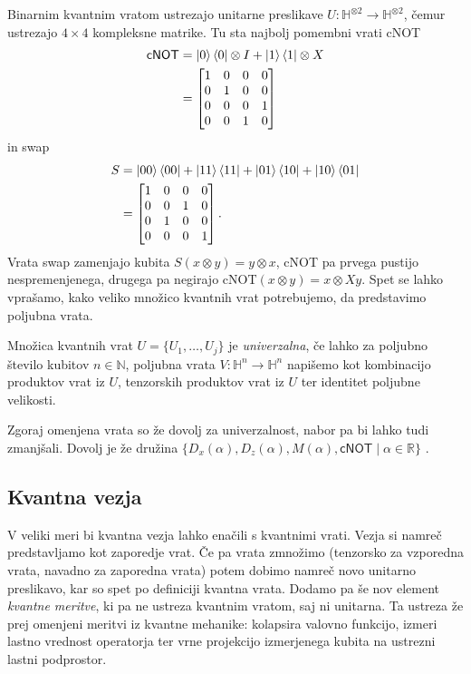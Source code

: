 \documentclass[mat1]{fmfdelo}
\newcommand{\R}{\mathbb R}
\newcommand{\N}{\mathbb N}
\newcommand{\Hb}{\mathbb H}
\begin{document}
Binarnim kvantnim vratom ustrezajo unitarne preslikave \(U:\Hb^{\otimes 2}\to \Hb^{\otimes 2}\), čemur ustrezajo \(4\times 4\) kompleksne matrike. Tu sta najbolj pomembni vrati \textsf{cNOT} 
\begin{align*}
    \mathsf{cNOT}&=\ket0\bra0\otimes I + \ket1\bra1\otimes X \\
    &=\begin{bmatrix}
        1&0&0&0\\
        0&1&0&0\\
        0&0&0&1\\
        0&0&1&0
    \end{bmatrix}
\end{align*}
in \textsf{swap}
\begin{align*}
    S &= \ket{00}\bra{00}+\ket{11}\bra{11}+\ket{01}\bra{10}+\ket{10}\bra{01}\\
    &=\begin{bmatrix}
        1&0&0&0\\
        0&0&1&0\\
        0&1&0&0\\
        0&0&0&1
    \end{bmatrix}.
\end{align*}
Vrata \textsf{swap} zamenjajo kubita \(S(x\otimes y)=y\otimes x\), \textsf{cNOT} pa prvega pustijo nespremenjenega, drugega pa negirajo \textsf{cNOT}\((x\otimes y)=x\otimes Xy\). Spet se lahko vprašamo, kako veliko množico kvantnih vrat potrebujemo, da predstavimo poljubna vrata.
\begin{definicija}
    Množica kvantnih vrat \(U=\{U_1,\ldots,U_j\}\) je \emph{univerzalna}, če lahko za poljubno število kubitov \(n\in\N\), poljubna vrata \(V:\Hb^n\to \Hb^n\) napišemo kot kombinacijo produktov vrat iz \(U\), tenzorskih produktov vrat iz \(U\) ter identitet poljubne velikosti.
\end{definicija}
Zgoraj omenjena vrata so že dovolj za univerzalnost, nabor pa bi lahko tudi zmanjšali. Dovolj je že družina \(\{D_x(\alpha),D_z(\alpha), M(\alpha), \mathsf{cNOT}\mid \alpha\in \R\}\) \cite[Lema 5.26]{mathforqm}.
\subsection{Kvantna vezja}
V veliki meri bi kvantna vezja lahko enačili s kvantnimi vrati. Vezja si namreč predstavljamo kot zaporedje vrat. Če pa vrata zmnožimo (tenzorsko za vzporedna vrata, navadno za zaporedna vrata) potem dobimo namreč novo unitarno preslikavo, kar so spet po definiciji kvantna vrata. Dodamo pa še nov element \emph{kvantne meritve}, ki pa ne ustreza kvantnim vratom, saj ni unitarna. Ta ustreza že prej omenjeni meritvi iz kvantne mehanike: kolapsira valovno funkcijo, izmeri lastno vrednost operatorja ter vrne projekcijo izmerjenega kubita na ustrezni lastni podprostor.
\end{document}

